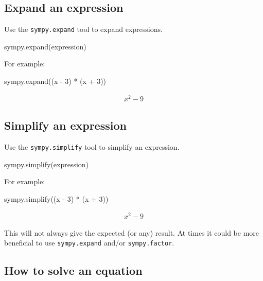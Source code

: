 \begin{pyin}
\subsection{Expand an expression}

Use the \texttt{sympy.expand} tool to expand expressions.

\begin{pyin}
sympy.expand(expression)
\end{pyin}


For example:




\begin{pyin}
sympy.expand((x - 3) * (x + 3))
\end{pyin}




\begin{equation*}
\begin{split}\displaystyle x^{2} - 9\end{split}
\end{equation*}




\subsection{Simplify an expression}

Use the \texttt{sympy.simplify} tool to simplify an expression.

\begin{pyin}
sympy.simplify(expression)
\end{pyin}


For example:




\begin{pyin}
sympy.simplify((x - 3) * (x + 3))
\end{pyin}




\begin{equation*}
\begin{split}\displaystyle x^{2} - 9\end{split}
\end{equation*}


This will not always give the expected (or any) result. At times it could be
more beneficial to use \texttt{sympy.expand} and/or \texttt{sympy.factor}.

\subsection{How to solve an equation}


\end{pyin}
